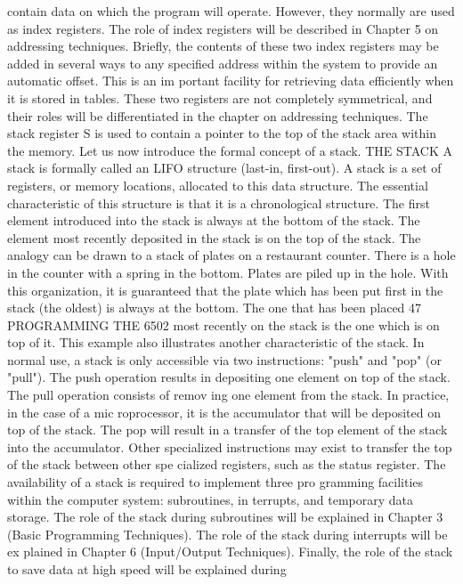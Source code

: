 \documentclass{book}
\begin{document}
contain data on which the program will operate. However, they
normally are used as index registers.
The role of index registers will be described in Chapter 5 on
addressing techniques. Briefly, the contents of these two index
registers may be added in several ways to any specified address
within the system to provide an automatic offset. This is an im
portant facility for retrieving data efficiently when it is stored in
tables. These two registers are not completely symmetrical, and
their roles will be differentiated in the chapter on addressing
techniques.
The stack register S is used to contain a pointer to the top of the
stack area within the memory.
Let us now introduce the formal concept of a stack.
THE STACK
A stack is formally called an LIFO structure (last-in, first-out). A
stack is a set of registers, or memory locations, allocated to this
data structure. The essential characteristic of this structure is
that it is a chronological structure. The first element introduced
into the stack is always at the bottom of the stack. The element
most recently deposited in the stack is on the top of the stack. The
analogy can be drawn to a stack of plates on a restaurant
counter. There is a hole in the counter with a spring in the bottom.
Plates are piled up in the hole. With this organization, it is
guaranteed that the plate which has been put first in the stack
(the oldest) is always at the bottom. The one that has been placed
47
PROGRAMMING THE 6502
most recently on the stack is the one which is on top of it. This
example also illustrates another characteristic of the stack. In
normal use, a stack is only accessible via two instructions: "push"
and "pop" (or "pull"). The push operation results in depositing one
element on top of the stack. The pull operation consists of remov
ing one element from the stack. In practice, in the case of a mic
roprocessor, it is the accumulator that will be deposited on top of
the stack. The pop will result in a transfer of the top element of
the stack into the accumulator. Other specialized instructions
may exist to transfer the top of the stack between other spe
cialized registers, such as the status register.
The availability of a stack is required to implement three pro
gramming facilities within the computer system: subroutines, in
terrupts, and temporary data storage. The role of the stack during
subroutines will be explained in Chapter 3 (Basic Programming
Techniques). The role of the stack during interrupts will be ex
plained in Chapter 6 (Input/Output Techniques). Finally, the role
of the stack to save data at high speed will be explained during
\end{document}
